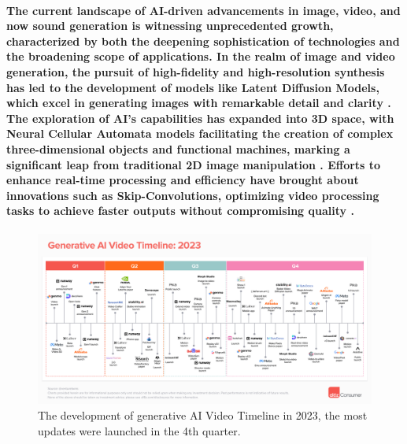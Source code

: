 \documentclass[11pt,a4paper,oneside]{report}
\begin{document}
\paragraph{The current landscape of AI-driven advancements in image, video, and now sound generation is witnessing unprecedented growth, characterized by both the deepening sophistication of technologies and the broadening scope of applications. In the realm of image and video generation, the pursuit of high-fidelity and high-resolution synthesis has led to the development of models like Latent Diffusion Models, which excel in generating images with remarkable detail and clarity \cite{rombach2022high}. The exploration of AI's capabilities has expanded into 3D space, with Neural Cellular Automata models facilitating the creation of complex three-dimensional objects and functional machines, marking a significant leap from traditional 2D image manipulation \cite{sudhakaran2021growing}. Efforts to enhance real-time processing and efficiency have brought about innovations such as Skip-Convolutions, optimizing video processing tasks to achieve faster outputs without compromising quality \cite{habibian2021skip}.}

\begin{figure}[htbp]
  \centering
  \includegraphics[width=\textwidth]{timeline.png}
  \caption{The development of generative AI Video Timeline in 2023, the most updates were launched in the 4th quarter. \cite{a16zAI2023}}
\end{figure}
\end{document}
